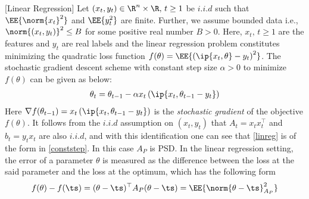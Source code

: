 \begin{comment}
We consider the vanilla version of the linear regression problem, where `amazing' results are known. It serves us to contrast the results we obtain for general linear stochastic approximation algorithms to the results known for this setting.
\end{comment}
\begin{example}\label{ex:leastsquares}[Linear Regression]
Let $(x_t,y_t)\in \R^n\times \R,\,t\geq 1$ be $i.i.d$ such that $\EE{\norm{x_t}^2}$ and $\EE{y_t^2}$ are finite. Further, we assume bounded data i.e., $\norm{(x_t,y_t)}^2\leq B$ for some positive real number $B>0$. Here, $x_t,\,t\geq 1$ are the features and $y_t$ are real labels and the linear regression problem constitutes minimizing the quadratic loss function $f(\theta)=\EE{\left(\ip{x_t,\theta}-y_t\right)^2}$. The stochastic gradient descent scheme with constant step size $\alpha>0$ to minimize $f(\theta)$ can be given as below:
\begin{align}\label{linreg}
\theta_t=\theta_{t-1}-\alpha x_t\left(\ip{x_t,\theta_{t-1} -y_t}\right)
\end{align}
Here $\nabla f(\theta_{t-1})=x_t\left(\ip{x_t,\theta_{t-1} -y_t}\right)$ is the \emph{stochastic gradient} of the objective $f(\theta)$. It follows from the $i.i.d$ assumption on $(x_t,y_t)$ that $A_t=x_t x_t^\top$ and $b_t=y_t x_t$ are also $i.i.d$, and with this identification one can see that \eqref{linreg} is of the form in \eqref{conststep}. In this case $A_P$ is PSD.
In the linear regression setting, the error of a parameter $\theta$ is measured as the difference between the loss at the said parameter and the loss at the optimum, which has the following form
\begin{align*}
f(\theta)-f(\ts)=(\theta-\ts)^\top A_P (\theta-\ts)=\EE{\norm{\theta-\ts}^2_{A_P}}
\end{align*}
\end{example}
